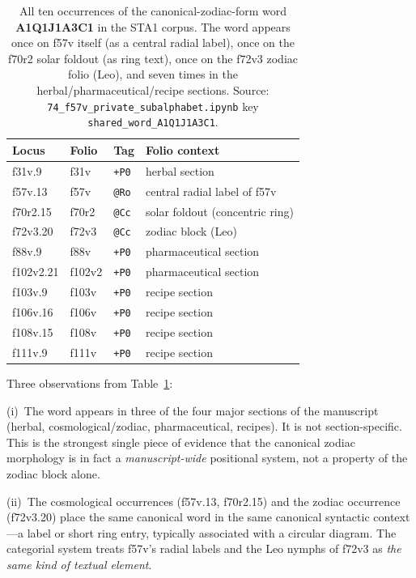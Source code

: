 \begin{table}[h]
\centering
\small
\begin{tabular}{llll}
\toprule
Locus & Folio & Tag & Folio context \\
\midrule
f31v.9    & f31v   & \texttt{+P0} & herbal section \\
f57v.13   & f57v   & \texttt{@Ro} & central radial label of f57v \\
f70r2.15  & f70r2  & \texttt{@Cc} & solar foldout (concentric ring) \\
f72v3.20  & f72v3  & \texttt{@Cc} & zodiac block (Leo) \\
f88v.9    & f88v   & \texttt{+P0} & pharmaceutical section \\
f102v2.21 & f102v2 & \texttt{+P0} & pharmaceutical section \\
f103v.9   & f103v  & \texttt{+P0} & recipe section \\
f106v.16  & f106v  & \texttt{+P0} & recipe section \\
f108v.15  & f108v  & \texttt{+P0} & recipe section \\
f111v.9   & f111v  & \texttt{+P0} & recipe section \\
\bottomrule
\end{tabular}
\caption{All ten occurrences of the canonical-zodiac-form word
\textbf{A1Q1J1A3C1} in the STA1 corpus. The word appears once on f57v
itself (as a central radial label), once on the f70r2 solar foldout (as
ring text), once on the f72v3 zodiac folio (Leo), and seven times in the
herbal/pharmaceutical/recipe sections. Source:
\texttt{74\_f57v\_private\_subalphabet.ipynb} key
\texttt{shared\_word\_A1Q1J1A3C1}.}
\label{tab:shared_word}
\end{table}

Three observations from Table~\ref{tab:shared_word}:

\noindent (i)~The word appears in three of the four major sections of
the manuscript (herbal, cosmological/zodiac, pharmaceutical, recipes).
It is not section-specific. This is the strongest single piece of
evidence that the canonical zodiac morphology is in fact a
\emph{manuscript-wide} positional system, not a property of the
zodiac block alone.

\noindent (ii)~The cosmological occurrences (f57v.13, f70r2.15) and
the zodiac occurrence (f72v3.20) place the same canonical word in the
same canonical syntactic context---a label or short ring entry,
typically associated with a circular diagram. The categorial system
treats f57v's radial labels and the Leo nymphs of f72v3 as
\emph{the same kind of textual element}.


